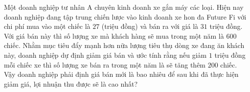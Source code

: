 \begin{bt}%
	Một doanh nghiệp tư nhân A chuyên kinh doanh xe gắn máy các loại. Hiện nay doanh nghiệp đang tập trung chiến lược vào kinh doanh xe hon đa Future Fi với chi phí mua vào một chiếc là $27$ (triệu đồng) và bán ra với giá là $31$ triệu đồng. Với giá bán này thì số lượng xe mà khách hàng sẽ mua trong một năm là $600$ chiếc. Nhằm mục tiêu đẩy mạnh hơn nữa lượng tiêu thụ dòng xe đang ăn khách này, doanh nghiệp dự định giảm giá bán và ước tính rằng nếu giảm $1$ triệu đồng mỗi chiếc xe thì số lượng xe bán ra trong một năm là sẽ tăng thêm $200$ chiếc. Vậy doanh nghiệp phải định giá bán mới là bao nhiêu để sau khi đã thực hiện giảm giá, lợi nhuận thu được sẽ là cao nhất?
\end{bt}

